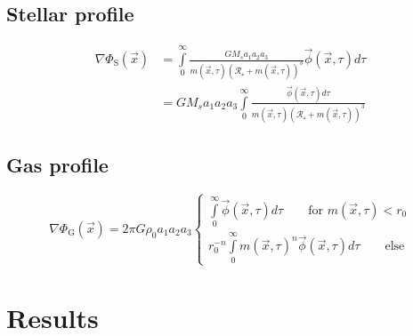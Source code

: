 	\subsection{Stellar profile}
	\begin{equation}
		\begin{array}{rl}
			\nabla \Phi_\text{S}(\vec{x}) & = \displaystyle\int\limits_{0}^{\infty} \frac{G M_{s} a_{1} a_{2} a_{3}}{m(\vec{x}, \tau)\left(\mathcal{R_s} + m(\vec{x}, \tau)\right)^{3}}
			\vec{\phi}(\vec{x}, \tau) d\tau \\
			& = G M_{s} a_{1} a_{2} a_{3} \displaystyle\int\limits_{0}^{\infty} \frac{ \vec{\phi}(\vec{x}, \tau) d\tau}{m(\vec{x}, \tau)\left(\mathcal{R_s} + m(\vec{x}, \tau)\right)^{3}}
		\end{array}
	\end{equation}
	\subsection{Gas profile}
	\begin{equation}
		\nabla \Phi_\text{G}(\vec{x}) = 2 \pi G \rho_0 a_{1} a_{2} a_{3}
		\left\{
		\begin{array}{l}
		\displaystyle\int\limits_{0}^{\infty} \vec{\phi}(\vec{x}, \tau) d\tau \qquad \text{for $m(\vec{x}, \tau) < r_0$}\\
		r_{0}^{- n} \displaystyle\int\limits_{0}^{\infty} m(\vec{x}, \tau)^{n}  \vec{\phi}(\vec{x}, \tau) d\tau \qquad \text{else}
		\end{array}
		\right.		
	\end{equation}
	\section{Results}
